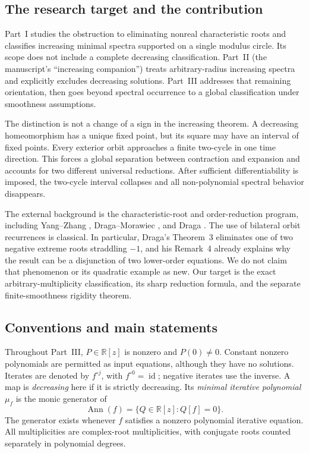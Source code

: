 \documentclass[11pt,letterpaper]{article}
\theoremstyle{definition}
\theoremstyle{remark}
\newcommand{\R}{\mathbb R}
\newcommand{\id}{\operatorname{id}}
\newcommand{\Ann}{\operatorname{Ann}}
\begin{document}
\subsection{The research target and the contribution}

Part~I studies the obstruction to eliminating nonreal characteristic roots
and classifies increasing minimal spectra supported on a single modulus
circle. Its scope does not include a complete decreasing classification.
Part~II (the manuscript's ``increasing companion'') treats arbitrary-radius
increasing spectra and explicitly excludes decreasing solutions. Part~III
addresses that remaining orientation, then goes beyond spectral occurrence to
a global classification under smoothness assumptions.

The distinction is not a change of a sign in the increasing theorem.
A decreasing homeomorphism has a unique fixed point, but its square may
have an interval of fixed points. Every exterior orbit approaches a
finite two-cycle in one time direction. This forces a global separation
between contraction and expansion and accounts for two different universal
reductions. After sufficient differentiability is imposed, the two-cycle
interval collapses and all non-polynomial spectral behavior disappears.

The external background is the characteristic-root and order-reduction
program, including Yang--Zhang \cite{YZ2004}, Draga--Morawiec \cite{DM2016},
and Draga \cite{D2016}. The use of bilateral orbit recurrences is classical.
In particular, Draga's Theorem~3 eliminates one of two negative extreme
roots straddling $-1$, and his Remark~4 already explains why the result
can be a disjunction of two lower-order equations. We do not claim that
phenomenon or its quadratic example as new. Our target is the exact
arbitrary-multiplicity classification, its sharp reduction formula,
and the separate finite-smoothness rigidity theorem.

\subsection{Conventions and main statements}
\label{nrr:dc:sec:main}

Throughout Part~III, $P\in\R[z]$ is nonzero and $P(0)\ne0$. Constant nonzero
polynomials are permitted as input equations, although they have no
solutions. Iterates are denoted by $f^{\circ j}$, with $f^{\circ0}=\id$;
negative iterates use the inverse. A map is \emph{decreasing} here if it
is strictly decreasing. Its \emph{minimal iterative polynomial} $\mu_f$
is the monic generator of
\[
 \Ann(f)=\{Q\in\R[z]:Q[f]=0\}.
\]
The generator exists whenever $f$ satisfies a nonzero polynomial iterative
equation. All multiplicities are complex-root multiplicities, with
conjugate roots counted separately in polynomial degrees.
\end{document}
